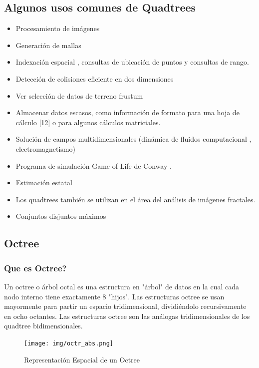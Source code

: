 \documentclass{article}
\begin{document}
\subsection{Algunos usos comunes de Quadtrees}
\begin{itemize}
    \item Procesamiento de imágenes
    \item Generación de mallas
    \item Indexación espacial , consultas de ubicación de puntos y consultas de rango.
    \item Detección de colisiones eficiente en dos dimensiones
    \item Ver selección de datos de terreno frustum
    \item Almacenar datos escasos, como información de formato para una hoja de cálculo [12] o para algunos cálculos matriciales.
    \item Solución de campos multidimensionales (dinámica de fluidos computacional , electromagnetismo)
    \item Programa de simulación Game of Life de Conway . 
    \item Estimación estatal 
    \item Los quadtrees también se utilizan en el área del análisis de imágenes fractales.
    \item Conjuntos disjuntos máximos
\end{itemize}   

\subsection{Octree}

\subsubsection{Que es Octree?}
Un octree o árbol octal es una estructura en "árbol" de datos en la cual cada nodo interno tiene exactamente 8 "hijos". Las estructuras octree se usan mayormente para partir un espacio tridimensional, dividiéndolo recursivamente en ocho octantes. Las estructuras octree son las análogas tridimensionales de los quadtree bidimensionales.

\begin{figure}[H]
\centering
\texttt{[image: img/octr\_abs.png]}
\caption{Representación Espacial de un Octree}
\end{figure}
\end{document}
